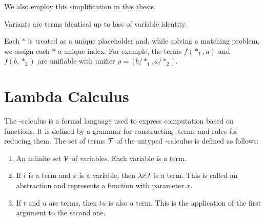 We also employ this simplification in this thesis.

\begin{defn}
  Variants are terms identical up to loss of variable identity.
\end{defn}

Each $*$ is treated as a unique placeholder and, while solving a matching problem, we assign each $*$ a unique index. For example, the terms $f(*_{1}, a)$ and $f(b, *_{2})$ are unifiable with unifier $\rho = [b/*_{1}, a/*_{2}]$.






\section{Lambda Calculus}
The \lam -calculus is a formal language used to express computation based on functions. It is defined by a grammar for constructing \lam -terms and rules for reducing them. The set of terms $\mathcal{T}$ of the untyped \lam -calculus is defined as follows:
\begin{enumerate}
  \item An infinite set $\mathcal{V}$ of variables. Each variable is a term.
  \item If $t$ is a term and $x$ is a variable, then $\lambda x. t$ is a term. This is called an abstraction and represents a function with parameter $x$.
  \item If $t$ and $u$ are terms, then $t u$ is also a term. This is the application of the first argument to the second one.
\end{enumerate}

